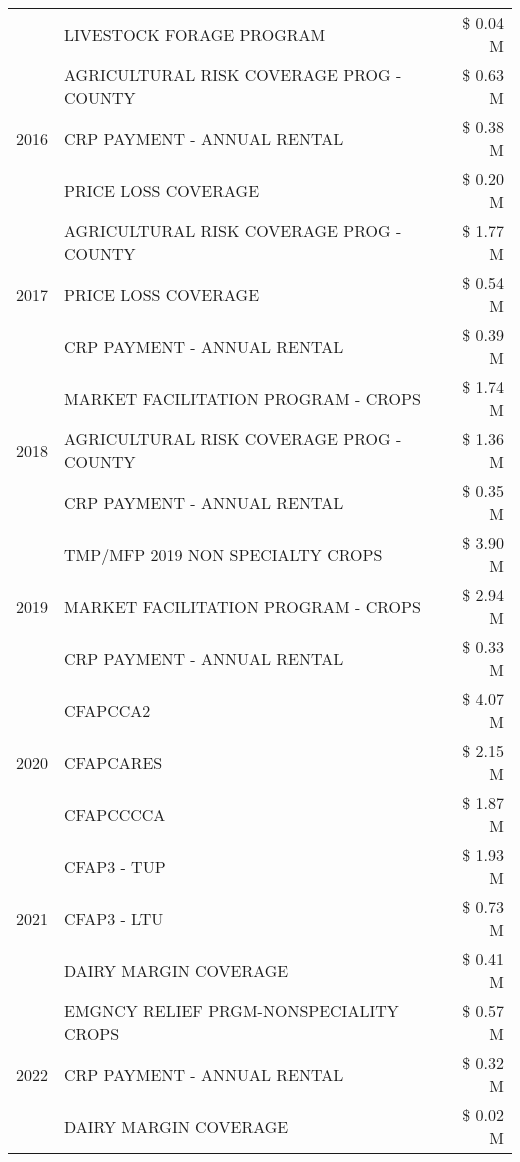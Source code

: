 \begin{tabular}{llr}
 & LIVESTOCK FORAGE PROGRAM & \$ 0.04 M \\
\cline{1-3}
\multirow[t]{3}{*}{2016} & AGRICULTURAL RISK COVERAGE PROG - COUNTY & \$ 0.63 M \\
 & CRP PAYMENT - ANNUAL RENTAL & \$ 0.38 M \\
 & PRICE LOSS COVERAGE & \$ 0.20 M \\
\cline{1-3}
\multirow[t]{3}{*}{2017} & AGRICULTURAL RISK COVERAGE PROG - COUNTY & \$ 1.77 M \\
 & PRICE LOSS COVERAGE & \$ 0.54 M \\
 & CRP PAYMENT - ANNUAL RENTAL & \$ 0.39 M \\
\cline{1-3}
\multirow[t]{3}{*}{2018} & MARKET FACILITATION PROGRAM - CROPS & \$ 1.74 M \\
 & AGRICULTURAL RISK COVERAGE PROG - COUNTY & \$ 1.36 M \\
 & CRP PAYMENT - ANNUAL RENTAL & \$ 0.35 M \\
\cline{1-3}
\multirow[t]{3}{*}{2019} & TMP/MFP 2019 NON SPECIALTY CROPS & \$ 3.90 M \\
 & MARKET FACILITATION PROGRAM - CROPS & \$ 2.94 M \\
 & CRP PAYMENT - ANNUAL RENTAL & \$ 0.33 M \\
\cline{1-3}
\multirow[t]{3}{*}{2020} & CFAPCCA2 & \$ 4.07 M \\
 & CFAPCARES & \$ 2.15 M \\
 & CFAPCCCCA & \$ 1.87 M \\
\cline{1-3}
\multirow[t]{3}{*}{2021} & CFAP3 - TUP & \$ 1.93 M \\
 & CFAP3 - LTU & \$ 0.73 M \\
 & DAIRY MARGIN COVERAGE & \$ 0.41 M \\
\cline{1-3}
\multirow[t]{3}{*}{2022} & EMGNCY RELIEF PRGM-NONSPECIALITY CROPS & \$ 0.57 M \\
 & CRP PAYMENT - ANNUAL RENTAL & \$ 0.32 M \\
 & DAIRY MARGIN COVERAGE & \$ 0.02 M \\
\cline{1-3}
\bottomrule
\end{tabular}
